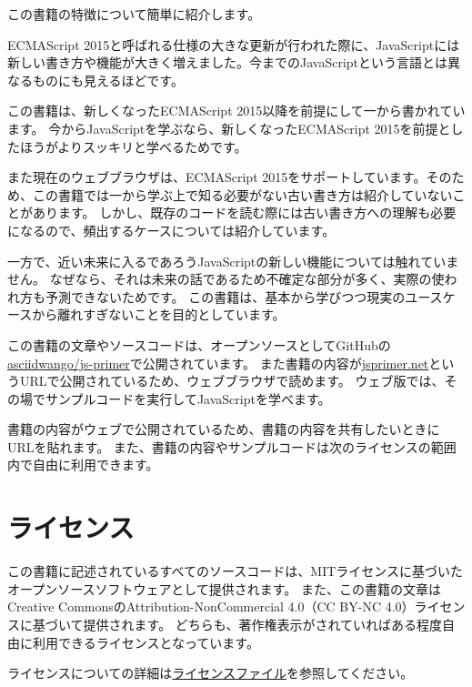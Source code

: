 この書籍の特徴について簡単に紹介します。

ECMAScript
2015と呼ばれる仕様の大きな更新が行われた際に、JavaScriptには新しい書き方や機能が大きく増えました。今までのJavaScriptという言語とは異なるものにも見えるほどです。

この書籍は、新しくなったECMAScript
2015以降を前提にして一から書かれています。
今からJavaScriptを学ぶなら、新しくなったECMAScript
2015を前提としたほうがよりスッキリと学べるためです。

また現在のウェブブラウザは、ECMAScript
2015をサポートしています。そのため、この書籍では一から学ぶ上で知る必要がない古い書き方は紹介していないことがあります。
しかし、既存のコードを読む際には古い書き方への理解も必要になるので、頻出するケースについては紹介しています。

一方で、近い未来に入るであろうJavaScriptの新しい機能については触れていません。
なぜなら、それは未来の話であるため不確定な部分が多く、実際の使われ方も予測できないためです。
この書籍は、基本から学びつつ現実のユースケースから離れすぎないことを目的としています。

この書籍の文章やソースコードは、オープンソースとしてGitHubの\href{https://github.com/asciidwango/js-primer}{asciidwango/js-primer}で公開されています。
また書籍の内容が\href{https://jsprimer.net/}{jsprimer.net}というURLで公開されているため、ウェブブラウザで読めます。
ウェブ版では、その場でサンプルコードを実行してJavaScriptを学べます。

書籍の内容がウェブで公開されているため、書籍の内容を共有したいときにURLを貼れます。
また、書籍の内容やサンプルコードは次のライセンスの範囲内で自由に利用できます。

\hypertarget{license}{%
\section*{ライセンス}\label{license}}

この書籍に記述されているすべてのソースコードは、MITライセンスに基づいたオープンソースソフトウェアとして提供されます。
また、この書籍の文章はCreative CommonsのAttribution-NonCommercial
4.0（CC BY-NC 4.0）ライセンスに基づいて提供されます。
どちらも、著作権表示がされていればある程度自由に利用できるライセンスとなっています。

ライセンスについての詳細は\href{https://github.com/asciidwango/js-primer/blob/master/LICENSE}{ライセンスファイル}を参照してください。
